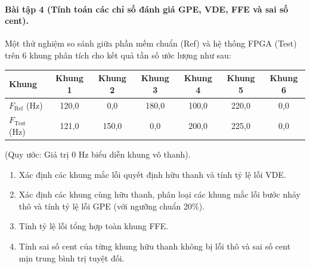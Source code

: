 \paragraph{Bài tập 4 (Tính toán các chỉ số đánh giá GPE, VDE, FFE và sai số cent).}
Một thử nghiệm so sánh giữa phần mềm chuẩn (Ref) và hệ thống FPGA (Test) trên 6 khung phân tích cho kết quả tần số ước lượng như sau:
\begin{center}
\small
\begin{tabular}{lcccccc}
\toprule
\textbf{Khung} & \textbf{Khung 1} & \textbf{Khung 2} & \textbf{Khung 3} & \textbf{Khung 4} & \textbf{Khung 5} & \textbf{Khung 6} \\
\midrule
$F_{\text{Ref}}$ (Hz) & 120{,}0 & 0{,}0 & 180{,}0 & 100{,}0 & 220{,}0 & 0{,}0 \\
$F_{\text{Test}}$ (Hz) & 121{,}0 & 150{,}0 & 0{,}0 & 200{,}0 & 225{,}0 & 0{,}0 \\
\bottomrule
\end{tabular}
\end{center}
(Quy ước: Giá trị 0 Hz biểu diễn khung vô thanh).
\begin{enumerate}[label=\alph*)]
    \item Xác định các khung mắc lỗi quyết định hữu thanh và tính tỷ lệ lỗi VDE.
    \item Xác định các khung cùng hữu thanh, phân loại các khung mắc lỗi bước nhảy thô và tính tỷ lệ lỗi GPE (với ngưỡng chuẩn 20\%).
    \item Tính tỷ lệ lỗi tổng hợp toàn khung FFE.
    \item Tính sai số cent của từng khung hữu thanh không bị lỗi thô và sai số cent mịn trung bình trị tuyệt đối.
\end{enumerate}

